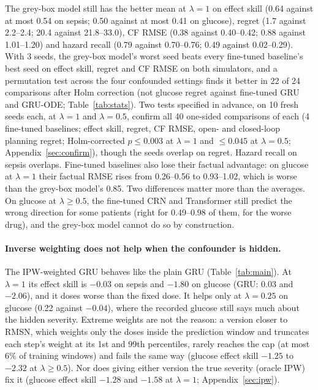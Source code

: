 \documentclass[letterpaper]{article}
\begin{document}
The grey-box model still has the better mean at $\lambda=1$ on effect skill (0.64 against at most 0.54 on sepsis; 0.50 against at most 0.41 on glucose), regret (1.7 against 2.2--2.4; 20.4 against 21.8--33.0), CF RMSE (0.38 against 0.40--0.42; 0.88 against 1.01--1.20) and hazard recall (0.79 against 0.70--0.76; 0.49 against 0.02--0.29). With 3 seeds, the grey-box model's worst seed beats every fine-tuned baseline's best seed on effect skill, regret and CF RMSE on both simulators, and a permutation test across the four confounded settings finds it better in 22 of 24 comparisons after Holm correction (not glucose regret against fine-tuned GRU and GRU-ODE; Table~\ref{tab:stats}). Two tests specified in advance, on 10 fresh seeds each, at $\lambda=1$ and $\lambda=0.5$, confirm all 40 one-sided comparisons of each (4 fine-tuned baselines; effect skill, regret, CF RMSE, open- and closed-loop planning regret; Holm-corrected $p\le0.003$ at $\lambda=1$ and $\le0.045$ at $\lambda=0.5$; Appendix~\ref{sec:confirm}), though the seeds overlap on regret. Hazard recall on sepsis overlaps. Fine-tuned baselines also lose their factual advantage: on glucose at $\lambda=1$ their factual RMSE rises from 0.26--0.56 to 0.93--1.02, which is worse than the grey-box model's 0.85. Two differences matter more than the averages. On glucose at $\lambda\ge0.5$, the fine-tuned CRN and Transformer still predict the wrong direction for some patients (right for 0.49--0.98 of them, for the worse drug), and the grey-box model cannot do so by construction.

\paragraph{Inverse weighting does not help when the confounder is hidden.} The IPW-weighted GRU behaves like the plain GRU (Table~\ref{tab:main}). At $\lambda=1$ its effect skill is $-0.03$ on sepsis and $-1.80$ on glucose (GRU: 0.03 and $-2.06$), and it doses worse than the fixed dose. It helps only at $\lambda=0.25$ on glucose (0.22 against $-0.04$), where the recorded glucose still says much about the hidden severity. Extreme weights are not the reason: a version closer to RMSN, which weights only the doses inside the prediction window and truncates each step's weight at its 1st and 99th percentiles, rarely reaches the cap (at most 6\% of training windows) and fails the same way (glucose effect skill $-1.25$ to $-2.32$ at $\lambda\ge0.5$). Nor does giving either version the true severity (oracle IPW) fix it (glucose effect skill $-1.28$ and $-1.58$ at $\lambda=1$; Appendix~\ref{sec:ipw}).
\end{document}
